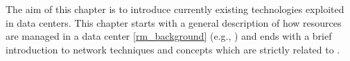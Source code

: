 The aim of this chapter is to introduce currently existing technologies exploited in data centers.
This chapter starts with a general description of how resources are managed in a data center \autoref{rm_background} (e.g., ) and ends with a brief introduction to network techniques and concepts which are strictly related to .